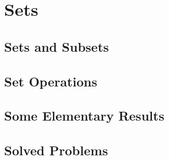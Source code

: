 \section{Sets}


\subsection{Sets and Subsets}

\subsection{Set Operations}

\subsection{Some Elementary Results}

\subsection{Solved Problems}